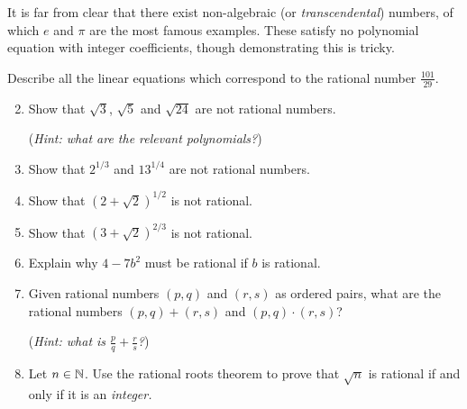 It is far from clear that there exist non-algebraic (or \emph{transcendental}) numbers, of which $e$ and $\pi$ are the most famous examples. These satisfy no polynomial equation with integer coefficients, though demonstrating this is tricky.
% 
% 
% 
% 


\begin{exercisessec}{}
	\exstart Describe all the linear equations which correspond to the rational number $\frac{101}{29}$.
	
	\begin{enumerate}\setcounter{enumi}{1}
	  \item %
	  Show that $\sqrt 3$, $\sqrt 5$ and $\sqrt{24}$ are not rational numbers.\par
	  (\emph{Hint: what are the relevant polynomials?})
	  
	  \item %
	  Show that $2^{1/3}$ and $13^{1/4}$ are not rational numbers.
	
	  \item%
	  Show that $(2+\sqrt 2)^{1/2}$ is not rational.
	  
	  
	  \item%
	  Show that $(3+\sqrt 2)^{2/3}$ is not rational.
	  
	  \item%
	  Explain why $4-7b^2$ must be rational if $b$ is rational.
	  
	  \item\label{exs:ratnumber+x} Given rational numbers $(p,q)$ and $(r,s)$ as ordered pairs, what are the rational numbers $(p,q)+(r,s)$ and $(p,q)\cdot(r,s)$?\par
	  (\emph{Hint: what is $\frac pq+\frac rs$?})
	  
	  \item Let $n\in\mathbb{N}$. Use the rational roots theorem to prove that $\sqrt n$ is rational if and only if it is an \emph{integer.}
	\end{enumerate}
\end{exercisessec}


